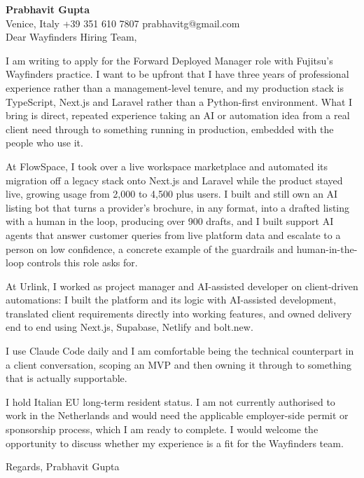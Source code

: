 \documentclass[a4paper,10.5pt]{article}
\begin{document}
\textbf{Prabhavit Gupta}\\
Venice, Italy \textbar{} +39 351 610 7807 \textbar{} prabhavitg@gmail.com\\[10pt]
Dear Wayfinders Hiring Team,

I am writing to apply for the Forward Deployed Manager role with Fujitsu's Wayfinders practice. I want to be upfront that I have three years of professional experience rather than a management-level tenure, and my production stack is TypeScript, Next.js and Laravel rather than a Python-first environment. What I bring is direct, repeated experience taking an AI or automation idea from a real client need through to something running in production, embedded with the people who use it.

At FlowSpace, I took over a live workspace marketplace and automated its migration off a legacy stack onto Next.js and Laravel while the product stayed live, growing usage from 2,000 to 4,500 plus users. I built and still own an AI listing bot that turns a provider's brochure, in any format, into a drafted listing with a human in the loop, producing over 900 drafts, and I built support AI agents that answer customer queries from live platform data and escalate to a person on low confidence, a concrete example of the guardrails and human-in-the-loop controls this role asks for.

At Urlink, I worked as project manager and AI-assisted developer on client-driven automations: I built the platform and its logic with AI-assisted development, translated client requirements directly into working features, and owned delivery end to end using Next.js, Supabase, Netlify and bolt.new.

I use Claude Code daily and I am comfortable being the technical counterpart in a client conversation, scoping an MVP and then owning it through to something that is actually supportable.

I hold Italian EU long-term resident status. I am not currently authorised to work in the Netherlands and would need the applicable employer-side permit or sponsorship process, which I am ready to complete. I would welcome the opportunity to discuss whether my experience is a fit for the Wayfinders team.

Regards, Prabhavit Gupta
\end{document}

